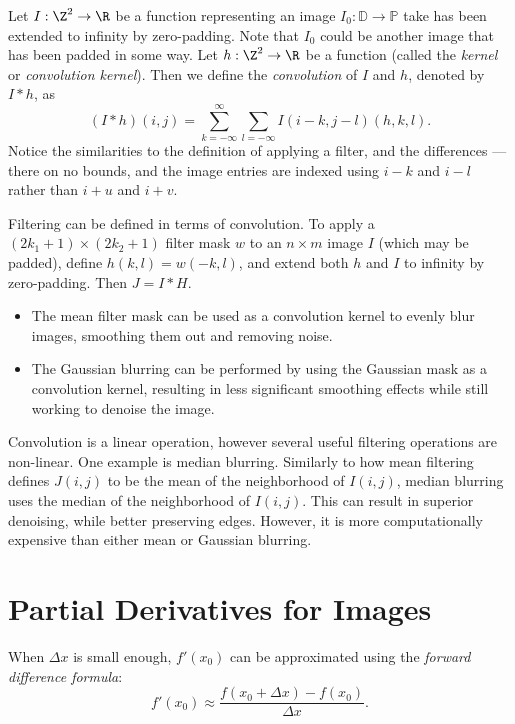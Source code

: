 \documentclass[12pt]{article}
\begin{document}
\begin{defn}
    Let $I: \Z^2 \to \R$ be a function representing an image $I_0: \mathbb{D} \to \mathbb{P}$ take has been extended to infinity by zero-padding. Note that $I_0$ could be another image that has been padded in some way. Let $h: \Z^2 \to \R$ be a function (called the \emph{kernel} or \emph{convolution kernel}). Then we define the \emph{convolution} of $I$ and $h$, denoted by $I * h$, as \[(I * h)(i, j) = \sum_{k=-\infty}^{\infty}\sum_{l=-\infty}I(i - k, j - l)(h, k, l).\] Notice the similarities to the definition of applying a filter, and the differences --- there on no bounds, and the image entries are indexed using $i - k$ and $i - l$ rather than $i + u$ and $i + v$.
\end{defn}

Filtering can be defined in terms of convolution. To apply a $(2k_1 + 1) \times (2k_2 + 1)$ filter mask $w$ to an $n \times m$ image $I$ (which may be padded), define $h(k, l) = w(-k, l)$, and extend both $h$ and $I$ to infinity by zero-padding. Then $J = I * H$.

\begin{exmp}\proofbreak
    \begin{itemize}
        \item The mean filter mask can be used as a convolution kernel to evenly blur images, smoothing them out and removing noise.
        \item The Gaussian blurring can be performed by using the Gaussian mask as a convolution kernel, resulting in less significant smoothing effects while still working to denoise the image.
    \end{itemize}
\end{exmp}

Convolution is a linear operation, however several useful filtering operations are non-linear. One example is median blurring. Similarly to how mean filtering defines $J(i, j)$ to be the mean of the neighborhood of $I(i, j)$, median blurring uses the median of the neighborhood of $I(i, j)$. This can result in superior denoising, while better preserving edges. However, it is more computationally expensive than either mean or Gaussian blurring.

\section{Partial Derivatives for Images}

\begin{defn}
    When $\Delta x$ is small enough, $f'(x_0)$ can be approximated using the \emph{forward difference formula}: \[f'(x_0) \approx \frac{f(x_0 + \Delta x) - f(x_0)}{\Delta x}.\]
\end{defn}
\end{document}
